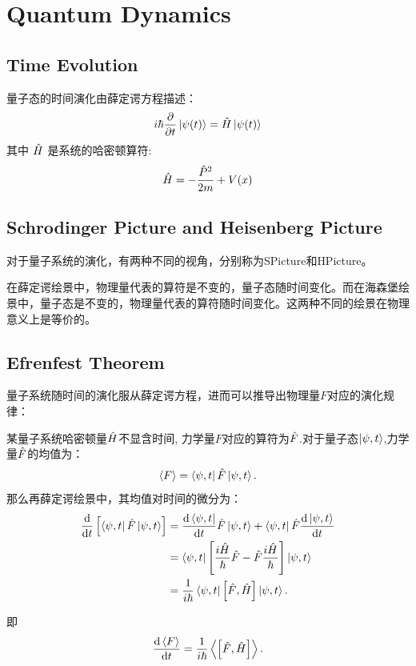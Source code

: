 \chapter{Quantum Dynamics}
\section{Time Evolution}
量子态的时间演化由薛定谔方程描述：
\begin{equation}
    i\hbar \frac{\partial}{\partial t} \left|\psi(t)\right> = \hat{H} \left|\psi(t)\right>
\end{equation}
其中 $\hat{H}$ 是系统的哈密顿算符:
\begin{equation}
    \hat{H}=-\frac{\hat{P}^2}{2m}+V(x)
\end{equation}

\section{Schrodinger Picture and Heisenberg Picture}
对于量子系统的演化，有两种不同的视角，分别称为\gls{SPicture}和\gls{HPicture}。

在薛定谔绘景中，物理量代表的算符是不变的，量子态随时间变化。而在海森堡绘景中，量子态是不变的，物理量代表的算符随时间变化。这两种不同的绘景在物理意义上是等价的。

\section{Efrenfest Theorem}
量子系统随时间的演化服从薛定谔方程，进而可以推导出物理量$F$对应的演化规律：
\begin{graybox}
    某量子系统哈密顿量$\hat{H}$不显含时间, 力学量$F$对应的算符为$\hat{F}$.对于量子态$\left|\psi,t\right>$,力学量$\hat{F}$的均值为：
    \begin{equation}
        \left<F\right>=\left<\psi,t\right|\hat{F}\left|\psi,t\right>.
    \end{equation}
    那么再薛定谔绘景中，其均值对时间的微分为：
    \begin{equation}
        \begin{aligned}
            \frac{\mathrm{d} }{\mathrm{d} t}\left[\left<\psi,t\right|\hat{F}\left|\psi,t\right>\right]&=\frac{\mathrm{d} \left<\psi,t\right|}{\mathrm{d} t}\hat{F}\left|\psi,t\right>+\left<\psi,t\right|\hat{F}\frac{\mathrm{d} \left|\psi,t\right>}{\mathrm{d} t}\\
            &=\left<\psi,t\right|\left[\frac{i\hat{H}}{\hbar}\hat{F}-\hat{F}\frac{i\hat{H}}{\hbar}\right]\left|\psi,t\right>\\
            &=\frac{1}{i\hbar}\left<\psi,t\right|\left[\hat{F},\hat{H}\right]\left|\psi,t\right>.
        \end{aligned}
    \end{equation}

    即
    \begin{equation}
        \frac{\mathrm{d} \left<F\right>}{\mathrm{d} t}=\frac{1}{i\hbar}\left<\left[\hat{F},\hat{H}\right]\right>.
    \end{equation}
\end{graybox}


